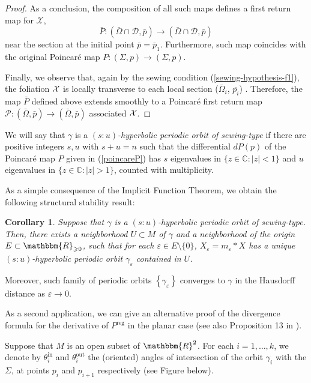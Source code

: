 \documentclass[11pt,psamsfonts]{article}
\newcommand{\tmem}[1]{{\em #1\/}}
\newtheorem{Corollary}[Theorem]{Corollary}
\theoremstyle{definition}
\theoremstyle{remark}
\newcommand{\cR}{\ensuremath{\mathbbm{R}}}
\newcommand{\eps}{\varepsilon }
\newcommand{\C}{\ensuremath{\mathbb{C}}}
\newcommand{\reg}{\mathrm{reg}}
\begin{document}
\begin{proof}
  As a conclusion, the composition of all such maps defines a first return
  map for $\mathcal{X}$,
  \[ \bar{P} : (\bar{\Omega} \cap \mathcal{D}, \bar{p} ) \rightarrow
     (\bar{\Omega} \cap \mathcal{D}, \bar{p}) \]
  near the section at the initial point $\bar{p} = \bar{p}_1$. Furthermore, such map
  coincides with the original Poincar{\'e} map $P : (\Sigma, p) \rightarrow
  (\Sigma, p)$.
  
  Finally, we observe that, again by the sewing condition (\ref{sewing-hypothesis-f1}),
  the foliation $\cal X$ is locally transverse to each local section 
  ($\bar{\Omega}_i$, $\overline{p_i}$) . Therefore, the map $\bar{P}$ defined
  above extends smoothly to a Poincar{\'e} first return map $\mathcal{P} :
  (\bar{\Omega}, \bar{p} ) \rightarrow (\bar{\Omega}, \bar{p})$ associated  $\cal X$.
\end{proof}

We will say that $\gamma$ is a {\tmem{$(s : u)$-hyperbolic periodic orbit of
sewing-type}} if there are positive integers $s,u$ with $s + u = n$ such that the differential $dP
(p)$ of the Poincaré map $P$ given in (\ref{poincareP}) has $s$ eigenvalues in $\{ z \in \C: | z | < 1 \}$ and $u$ eigenvalues in $\{ z \in \C
: | z | > 1 \}$, counted with multiplicity.

As a simple consequence of the Implicit Function Theorem, we obtain the
following structural stability result:

\begin{Corollary}
  Suppose that $\gamma$ is a $(s : u)$-hyperbolic periodic orbit of
  sewing-type. Then, there exists a neighborhood $U \subset M$ of $\gamma$ and
  a neighborhood of the origin $E \subset \cR_{\geqslant
  0}$, such that for each $\eps \in E\setminus\{0\}$, $X_\eps = m_\eps \ast X$ has a unique $(s : u)$-hyperbolic
  periodic orbit $\gamma_{\eps}$ contained in $U$. 
\end{Corollary}
Moreover, such family of periodic orbits $\left\{ \gamma_{\eps}
\right\}$ converges to $\gamma$ in the Hausdorff distance as $\eps \rightarrow 0$. 


As a second application, we can give an alternative proof of the divergence formula for the derivative of $P^\reg$ in the planar case 
(see also Proposition 13 in \cite{SM}). 

Suppose that $M$ is an open subset of $\cR^2$. For each $i=1,\ldots,k$, we denote by $\theta_i^{\mathrm{in}}$ and $\theta_i^{\mathrm{out}}$ the (oriented) angles of intersection of the orbit $\gamma_i$ with the $\Sigma$, at points $p_i$ and $p_{i+1}$ respectively (see Figure below).  
\end{document}
